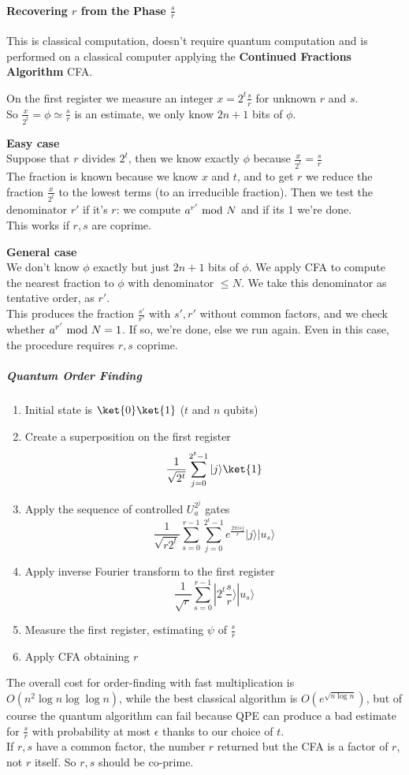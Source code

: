 \documentclass[10pt]{report}
\begin{document}
\paragraph{Recovering $r$ from the Phase $\frac{s}{r}$} This is classical computation, doesn't require quantum computation and is performed on a classical computer applying the \textbf{Continued Fractions Algorithm} CFA.\begin{list}{}{}
	\item On the first register we measure an integer $x=2^t\frac{s}{r}$ for unknown $r$ and $s$.\\
	So $\frac{x}{2^t}=\phi \simeq \frac{s}{r}$ is an estimate, we only know $2n+1$ bits of $\phi$.
	\item \textbf{Easy case}\\
	Suppose that $r$ divides $2^t$, then we know exactly $\phi$ because $\frac{x}{2^t}=\frac{s}{r}$\\
	The fraction is known because we know $x$ and $t$, and to get $r$ we reduce the fraction $\frac{x}{2^t}$ to the lowest terms (to an irreducible fraction). Then we test the denominator $r'$ if it's $r$: we compute $a^{r'}\hbox{ mod }N$ and if its $1$ we're done.\\
	This works if $r,s$ are coprime.
	\item \textbf{General case}\\
	We don't know $\phi$ exactly but just $2n+1$ bits of $\phi$. We apply CFA to compute the nearest fraction to $\phi$ with denominator $\leq N$. We take this denominator as tentative order, as $r'$.\\
	This produces the fraction $\frac{s'}{r'}$ with $s',r'$ without common factors, and we check whether $a^{r'}\hbox{ mod }N =1$. If so, we're done, else we run again. Even in this case, the procedure requires $r,s$ coprime.
\end{list}
\subparagraph{Quantum Order Finding}
\begin{enumerate}
	\item Initial state is $\ket{0}\ket{1}$ ($t$ and $n$ qubits)
	\item Create a superposition on the first register $$\frac{1}{\sqrt{2^t}}\sum_{j=0}^{2^t-1}|j\rangle\ket{1}$$
	\item Apply the sequence of controlled $U_a^{2^j}$ gates
	 $$\frac{1}{\sqrt{r2^t}}\sum_{s=0}^{r-1}\sum_{j=0}^{2^t-1}e^{\frac{2\pi isj}{r}}|j\rangle|u_s\rangle$$
	 \item Apply inverse Fourier transform to the first register
	 $$\frac{1}{\sqrt{r}}\sum_{s=0}^{r-1}|2^t\frac{s}{r}\rangle|u_s\rangle$$
	 \item Measure the first register, estimating $\psi$ of $\frac{s}{r}$
	 \item Apply CFA obtaining $r$
\end{enumerate}
The overall cost for order-finding with fast multiplication is $O(n^2\log n\log\log n)$, while the best classical algorithm is $O(e^{\sqrt{n\log n}})$, but of course the quantum algorithm can fail because QPE can produce a bad estimate for $\frac{s}{r}$ with probability at most $\epsilon$ thanks to our choice of $t$.\\
If $r,s$ have a common factor, the number $r$ returned but the CFA is a factor of $r$, not $r$ itself. So $r,s$ should be co-prime.
\end{document}
